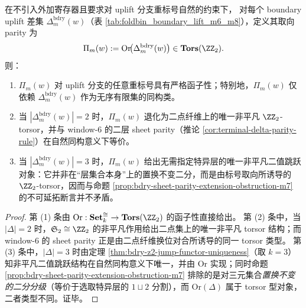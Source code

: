 \begin{corollary}\label{cor:bdry-uplift-orientation-parity}
在不引入外加寄存器且要求对 uplift 分支重标号自然的约束下，
对每个 boundary uplift 差集 \(\Delta_m^{\mathrm{bdry}}(w)\)（表 \ref{tab:foldbin_boundary_lift_m6_m8}），定义其取向 parity 为
\[
\Pi_m(w):=\mathrm{Or}\!\bigl(\Delta_m^{\mathrm{bdry}}(w)\bigr)\in \mathbf{Tors}(\ZZ_2).
\]
则：
\begin{enumerate}
  \item \(\Pi_m(w)\) 对 uplift 分支的任意重标号具有严格函子性；特别地，\(\Pi_m(w)\) 仅依赖 \(\Delta_m^{\mathrm{bdry}}(w)\) 作为无序有限集的同构类。
  \item 当 \(|\Delta_m^{\mathrm{bdry}}(w)|=2\) 时，\(\Pi_m(w)\) 退化为二点纤维上的唯一非平凡 \(\ZZ_2\)-torsor，并与 window-\(6\) 的二层 sheet parity（推论 \ref{cor:terminal-delta-parity-rule}）在自然同构意义下等价。
  \item 当 \(|\Delta_m^{\mathrm{bdry}}(w)|=3\) 时，\(\Pi_m(w)\) 给出无需指定特异层的唯一非平凡二值跳跃对象：它并非在“层集合本身”上的置换不变二分，而是由标号取向所诱导的 \(\ZZ_2\)-torsor，因而与命题 \ref{prop:bdry-sheet-parity-extension-obstruction-m7} 的不可延拓断言并不矛盾。
\end{enumerate}
\end{corollary}

\begin{proof}
第 (1) 条由 \(\mathrm{Or}:\mathbf{Set}_k^{\cong}\to\mathbf{Tors}(\ZZ_2)\) 的函子性直接给出。
第 (2) 条中，当 \(|\Delta|=2\) 时，\(\mathfrak{S}_2\cong\ZZ_2\) 的非平凡作用给出二点集上的唯一非平凡 torsor 结构；而 window-\(6\) 的 sheet parity 正是由二点纤维换位对合所诱导的同一 torsor 类型。
第 (3) 条中，\(|\Delta|=3\) 时由定理 \ref{thm:bdry-z2-jump-functor-uniqueness}（取 \(k=3\)）知非平凡二值跳跃结构在自然同构意义下唯一，并由 \(\mathrm{Or}\) 实现；同时命题 \ref{prop:bdry-sheet-parity-extension-obstruction-m7} 排除的是对三元集合\emph{置换不变的二分分级}（等价于选取特异层的 \(1\sqcup 2\) 分割），而 \(\mathrm{Or}(\Delta)\) 属于 torsor 型对象，二者类型不同。证毕。
\end{proof}

